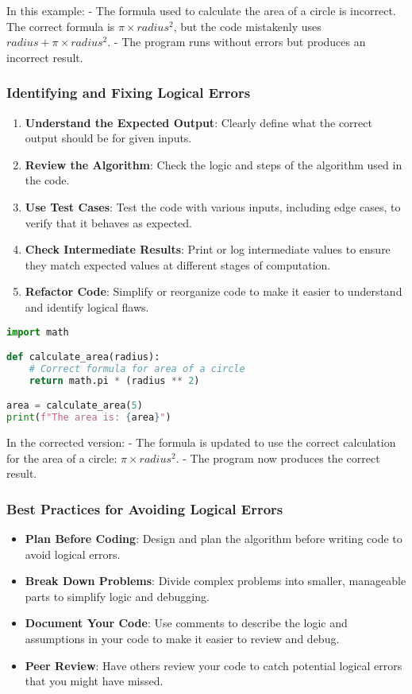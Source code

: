 In this example:
- The formula used to calculate the area of a circle is incorrect. The correct formula is \( \pi \times radius^2 \), but the code mistakenly uses \( radius + \pi \times radius^2 \). 
- The program runs without errors but produces an incorrect result.

\subsubsection{Identifying and Fixing Logical Errors}

\begin{enumerate}
    \item \textbf{Understand the Expected Output}: Clearly define what the correct output should be for given inputs.
    \item \textbf{Review the Algorithm}: Check the logic and steps of the algorithm used in the code.
    \item \textbf{Use Test Cases}: Test the code with various inputs, including edge cases, to verify that it behaves as expected.
    \item \textbf{Check Intermediate Results}: Print or log intermediate values to ensure they match expected values at different stages of computation.
    \item \textbf{Refactor Code}: Simplify or reorganize code to make it easier to understand and identify logical flaws.
\end{enumerate}

\begin{lstlisting}[language=Python, caption=Improved Version of the Logical Error Example]
import math

def calculate_area(radius):
    # Correct formula for area of a circle
    return math.pi * (radius ** 2)

area = calculate_area(5)
print(f"The area is: {area}")
\end{lstlisting}

In the corrected version:
- The formula is updated to use the correct calculation for the area of a circle: \( \pi \times radius^2 \).
- The program now produces the correct result.

\subsubsection{Best Practices for Avoiding Logical Errors}

\begin{itemize}
    \item \textbf{Plan Before Coding}: Design and plan the algorithm before writing code to avoid logical errors.
    \item \textbf{Break Down Problems}: Divide complex problems into smaller, manageable parts to simplify logic and debugging.
    \item \textbf{Document Your Code}: Use comments to describe the logic and assumptions in your code to make it easier to review and debug.
    \item \textbf{Peer Review}: Have others review your code to catch potential logical errors that you might have missed.
\end{itemize}

